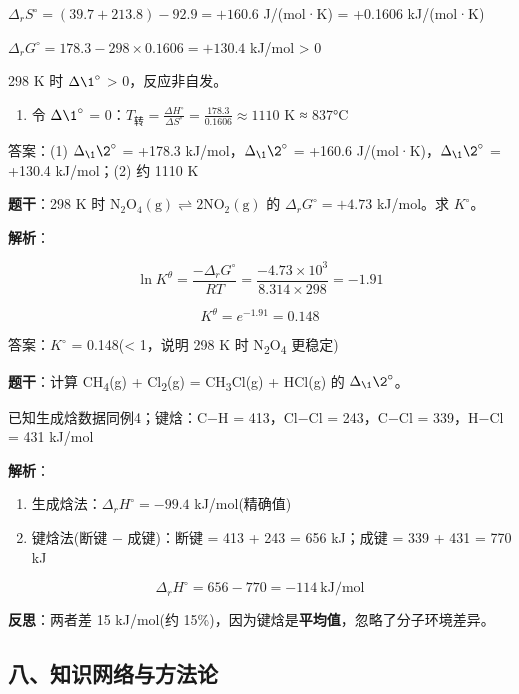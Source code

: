 \documentclass[a4paper,11pt]{ctexart}
\providecommand{\tightlist}{\setlength{\itemsep}{0pt}\setlength{\parskip}{0pt}}
\begin{document}
\(\Delta_r S^\circ = (39.7 + 213.8) - 92.9 = +160.6\) J/(mol·K) = +0.1606 kJ/(mol·K)

\(\Delta_r G^\circ = 178.3 - 298 \times 0.1606 = +130.4\) kJ/mol \textgreater{} 0

298 K 时 \(\Delta \1^{\circ}\) \textgreater{} 0，反应非自发。

\begin{enumerate}
\def\labelenumi{(\arabic{enumi})}
\setcounter{enumi}{1}
\tightlist
\item
  令 \(\Delta \1^{\circ}\) = 0：\(T_{\text{转}} = \frac{\Delta H^\circ}{\Delta S^\circ} = \frac{178.3}{0.1606} \approx 1110\) K ≈ 837°C
\end{enumerate}

答案：(1) \(\Delta_{\1} \2^{\circ}\) = +178.3 kJ/mol，\(\Delta_{\1} \2^{\circ}\) = +160.6 J/(mol·K)，\(\Delta_{\1} \2^{\circ}\) = +130.4 kJ/mol；(2) 约 1110 K

\textbf{题干}：298 K 时 \(\mathrm{N_2O_4(g) \rightleftharpoons 2NO_2(g)}\) 的 \(\Delta_r G^\circ = +4.73\) kJ/mol。求 \(K^{\circ}\)。

\textbf{解析}：

\[\ln K^\theta = \frac{-\Delta_r G^\circ}{RT} = \frac{-4.73 \times 10^3}{8.314 \times 298} = -1.91\]

\[K^\theta = e^{-1.91} = 0.148\]

答案：\(K^{\circ}\) = 0.148(\textless{} 1，说明 298 K 时 N\textsubscript{2}O\textsubscript{4} 更稳定)

\textbf{题干}：计算 CH\textsubscript{4}(g) + Cl\textsubscript{2}(g) = CH\textsubscript{3}Cl(g) + HCl(g) 的 \(\Delta_{\1} \2^{\circ}\)。

已知生成焓数据同例4；键焓：C−H = 413，Cl−Cl = 243，C−Cl = 339，H−Cl = 431 kJ/mol

\textbf{解析}：

\begin{enumerate}
\def\labelenumi{(\arabic{enumi})}
\item
  生成焓法：\(\Delta_r H^\circ = -99.4\) kJ/mol(精确值)
\item
  键焓法(断键 − 成键)：断键 = 413 + 243 = 656 kJ；成键 = 339 + 431 = 770 kJ
\end{enumerate}

\[\Delta_r H^\circ = 656 - 770 = -114\ \mathrm{kJ/mol}\]

\textbf{反思}：两者差 15 kJ/mol(约 15\%)，因为键焓是\textbf{平均值}，忽略了分子环境差异。

\subsection{八、知识网络与方法论}\label{ux516bux77e5ux8bc6ux7f51ux7edcux4e0eux65b9ux6cd5ux8bba}
\end{document}
